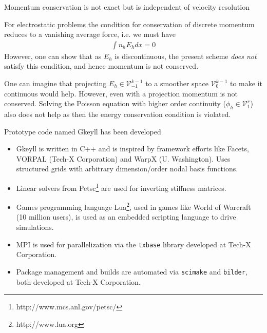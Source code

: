 \documentclass[pdf]{beamer}
\theoremstyle{definition}
\begin{document}
\begin{frame}{Momentum conservation is not exact but is independent
    of velocity resolution}%

  For electrostatic problems the condition for conservation of
  discrete momentum reduces to a vanishing average force, i.e. we must
  have
  \begin{align*}
    \int n_h E_h dx = 0
  \end{align*}
  However, one can show that as $E_h$ is discontinuous, the present
  scheme \emph{does not} satisfy this condition, and hence momentum is
  not conserved.

  One can imagine that projecting $E_h \in \mathcal{V}_{-1}^{k-1}$ to
  a smoother space $\mathcal{V}_0^{k-1}$ to make it continuous would
  help. However, even with a projection momentum is not
  conserved. Solving the Poisson equation with higher order continuity
  ($\phi_h \in \mathcal{V}_1^r$) also does not help as then the energy
  conservation condition is violated.
\end{frame}

\begin{frame}{Prototype code named Gkeyll has been developed}%

  \begin{itemize}
  \item Gkeyll is written in C++ and is inspired by framework efforts
    like Facets, VORPAL (Tech-X Corporation) and WarpX
    (U. Washington). Uses structured grids with arbitrary
    dimension/order nodal basis functions.
  \item Linear solvers from
    Petsc\footnote{http://www.mcs.anl.gov/petsc/} are used for
    inverting stiffness matrices.
  \item Games programming language Lua\footnote{http://www.lua.org},
    used in games like World of Warcraft (10 million users), is used
    as an embedded scripting language to drive simulations.
  \item MPI is used for parallelization via the {\tt txbase} library
    developed at Tech-X Corporation.
  \item Package management and builds are automated via {\tt scimake}
    and {\tt bilder}, both developed at Tech-X Corporation.
  \end{itemize}
  
\end{frame}
\end{document}
